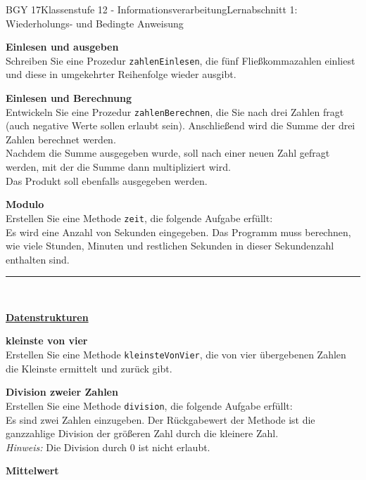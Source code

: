 \documentclass[oneside,openany,headings=optiontotoc,11pt,numbers=noenddot]{scrreprt}
\begin{document}
\begin{worksheet}{BGY 17}{Klassenstufe 12 - Informationsverarbeitung}{Lernabschnitt 1: Wiederholungs- und Bedingte Anweisung}
\begin{framed}
			\textbf{Einlesen und ausgeben}\\
			Schreiben Sie eine Prozedur \lstinline[style=JavaInputStyle]|zahlenEinlesen|, die fünf Fließkommazahlen einliest und diese in umgekehrter Reihenfolge wieder ausgibt.\\
			\par\noindent
			\textbf{Einlesen und Berechnung}\\
			Entwickeln Sie eine Prozedur \lstinline[style=JavaInputStyle]|zahlenBerechnen|, die Sie nach drei Zahlen fragt (auch negative Werte sollen erlaubt sein). Anschließend wird die Summe der drei Zahlen berechnet werden.\\
			Nachdem die Summe ausgegeben wurde, soll nach einer neuen Zahl gefragt werden, mit der die Summe dann multipliziert wird.\\
			Das Produkt soll ebenfalls ausgegeben werden.\\
			\par\noindent
			\textbf{Modulo}\\
			Erstellen Sie eine Methode \lstinline[style=JavaInputStyle]|zeit|, die folgende Aufgabe erfüllt:\\
			Es wird eine Anzahl von Sekunden eingegeben. Das Programm muss berechnen, wie viele Stunden, Minuten und restlichen Sekunden in dieser Sekundenzahl enthalten sind.
			\rule{\textwidth}{0.1pt}\\
			\par\noindent
			\large{\textbf{\underline{Datenstrukturen}}}\\
			\normalsize
			\par\noindent
			\textbf{kleinste von vier}\\
			Erstellen Sie eine Methode \lstinline[style=JavaInputStyle]|kleinsteVonVier|, die von vier übergebenen Zahlen die Kleinste ermittelt und zurück gibt.\\
			\par\noindent
			\textbf{Division zweier Zahlen}\\
			Erstellen Sie eine Methode \lstinline[style=JavaInputStyle]|division|, die folgende Aufgabe erfüllt:\\
			Es sind zwei Zahlen einzugeben. Der Rückgabewert der Methode ist die ganzzahlige Division der größeren Zahl durch die kleinere Zahl.\\
			\textit{Hinweis:} Die Division durch \(0\) ist nicht erlaubt.\\
			\par\noindent
			\textbf{Mittelwert}\\

\end{framed}
\end{worksheet}
\end{document}
